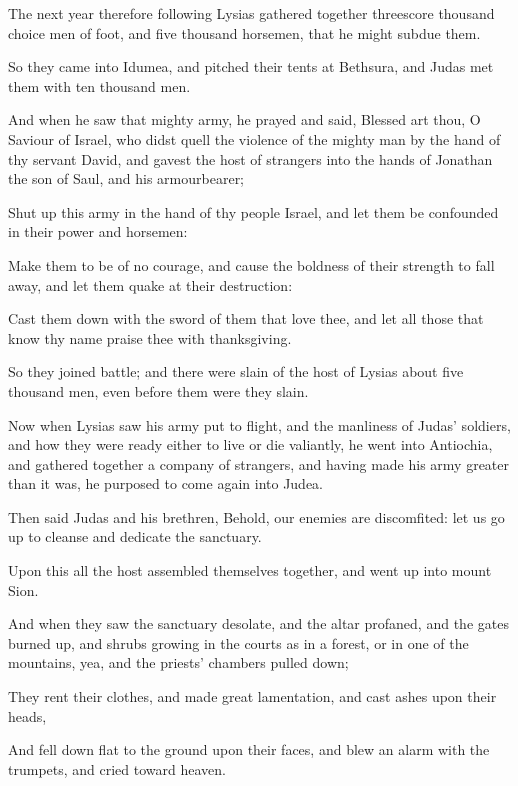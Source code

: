 {\par }{\PP {}The next year therefore following Lysias gathered together threescore thousand choice men of foot, and five thousand horsemen, that he might subdue them.
\par }{\PP {}So they came into Idumea, and pitched their tents at Bethsura, and Judas met them with ten thousand men.
\par }{\PP {}And when he saw that mighty army, he prayed and said, Blessed art thou, O Saviour of Israel, who didst quell the violence of the mighty man by the hand of thy servant David, and gavest the host of strangers into the hands of Jonathan the son of Saul, and his armourbearer;
\par }{\PP {}Shut up this army in the hand of thy people Israel, and let them be confounded in their power and horsemen:
\par }{\PP {}Make them to be of no courage, and cause the boldness of their strength to fall away, and let them quake at their destruction:
\par }{\PP {}Cast them down with the sword of them that love thee, and let all those that know thy name praise thee with thanksgiving.
\par }{\PP {}So they joined battle; and there were slain of the host of Lysias about five thousand men, even before them were they slain.
\par }{\PP {}Now when Lysias saw his army put to flight, and the manliness of Judas’ soldiers, and how they were ready either to live or die valiantly, he went into Antiochia, and gathered together a company of strangers, and having made his army greater than it was, he purposed to come again into Judea.
\par }{\PP {}Then said Judas and his brethren, Behold, our enemies are discomfited: let us go up to cleanse and dedicate the sanctuary.
\par }{\PP {}Upon this all the host assembled themselves together, and went up into mount Sion.
\par }{\PP {}And when they saw the sanctuary desolate, and the altar profaned, and the gates burned up, and shrubs growing in the courts as in a forest, or in one of the mountains, yea, and the priests’ chambers pulled down;
\par }{\PP {}They rent their clothes, and made great lamentation, and cast ashes upon their heads,
\par }{\PP {}And fell down flat to the ground upon their faces, and blew an alarm with the trumpets, and cried toward heaven.
}
